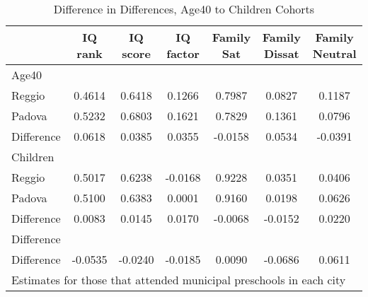 \begin{table}[htbp]\centering
\caption{Difference in Differences, Age40 to Children Cohorts}
\begin{tabular}{l*{6}{c}}
\hline\hline
            &     IQ rank&    IQ score&   IQ factor&  Family Sat&Family Dissat&Family Neutral\\
\hline
Age40       &            &            &            &            &            &            \\
Reggio      &      0.4614&      0.6418&      0.1266&      0.7987&      0.0827&      0.1187\\
Padova      &      0.5232&      0.6803&      0.1621&      0.7829&      0.1361&      0.0796\\
Difference  &      0.0618&      0.0385&      0.0355&     -0.0158&      0.0534&     -0.0391\\
\hline
Children    &            &            &            &            &            &            \\
Reggio      &      0.5017&      0.6238&     -0.0168&      0.9228&      0.0351&      0.0406\\
Padova      &      0.5100&      0.6383&      0.0001&      0.9160&      0.0198&      0.0626\\
Difference  &      0.0083&      0.0145&      0.0170&     -0.0068&     -0.0152&      0.0220\\
\hline
Difference  &            &            &            &            &            &            \\
Difference  &     -0.0535&     -0.0240&     -0.0185&      0.0090&     -0.0686&      0.0611\\
\hline\hline
\multicolumn{7}{l}{\footnotesize Estimates for those that attended municipal preschools in each city}\\
\end{tabular}
\end{table}

